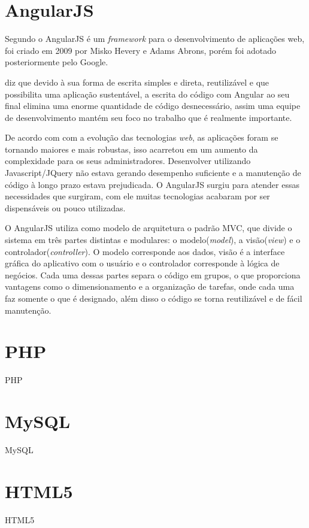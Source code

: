 \section{AngularJS}
	\par Segundo  o AngularJS é um \textit{framework} para o desenvolvimento de aplicações web, foi criado em 2009 por Misko Hevery e Adams Abrons, porém foi adotado posteriormente pelo Google.
	\par {} diz que devido à sua forma de escrita simples e direta, reutilizável e que possibilita uma aplicação sustentável, a escrita do código com Angular ao seu final elimina uma enorme quantidade de código desnecessário, assim uma equipe de desenvolvimento mantém seu foco no trabalho que é realmente importante.
	\par De acordo com  com a evolução das tecnologias \textit{web}, as aplicações foram se tornando maiores e mais robustas, isso acarretou em um aumento da complexidade para os seus administradores. Desenvolver utilizando Javascript/JQuery não estava gerando desempenho suficiente e a manutenção de código à longo prazo estava prejudicada. O AngularJS surgiu para atender essas necessidades que surgiram, com ele muitas tecnologias acabaram por ser dispensáveis ou pouco utilizadas.
	\par O AngularJS utiliza como modelo de arquitetura o padrão MVC, que divide o sistema em três partes distintas e modulares: o modelo(\textit{model}), a visão(\textit{view}) e o controlador(\textit{controller}). O modelo corresponde aos dados, visão é a interface gráfica do aplicativo com o usuário e o controlador corresponde à lógica de negócios. Cada uma dessas partes separa o código em grupos, o que proporciona vantagens como o dimensionamento e a organização de tarefas, onde cada uma faz somente o que é designado, além disso o código se torna reutilizável e de fácil manutenção. 
	
	

\section{PHP}
	\par PHP

\section{MySQL}
	\par MySQL

\section{HTML5}
	\par HTML5